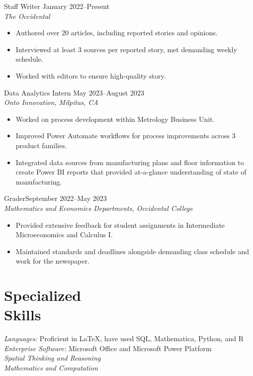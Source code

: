 \documentclass[margin, 12pt]{res} %
\begin{document}
\begin{resume}
Staff Writer \hfill January 2022--Present \\
\textit{The Occidental} 
\begin{itemize} \itemsep -2pt
  \item Authored over 20 articles, including reported stories and opinions.
  \item Interviewed at least 3 sources per reported story, met demanding weekly schedule.
  \item Worked with editors to ensure high-quality story.
\end{itemize} 

{Data Analytics Intern} \hfill May 2023--August 2023 \\
\textit{Onto Innovation, Milpitas, CA}
\begin{itemize} \itemsep -2pt %
  \item Worked on process development within Metrology Business Unit.
  \item Improved Power Automate workflows for process improvements across 3 product families.
  \item Integrated data sources from manufacturing plans and floor information to create Power BI reports that provided at-a-glance understanding of state of manufacturing.
\end{itemize}

Grader\hfill September 2022--May 2023\\
\textit{Mathematics and Economics Departments, Occidental College}
\begin{itemize}\itemsep -2pt
  \item Provided extensive feedback for student assignments in Intermediate Microeconomics and Calculus I.
  \item Maintained standards and deadlines alongside demanding class schedule and work for the newspaper.
\end{itemize}


\section{\sc Specialized \\ Skills} 

{\sl Languages:} Proficient in \LaTeX, have used SQL, Mathematica, Python, and R\\
{\sl Enterprise Software:} Microsoft Office and Microsoft Power Platform\\
{\sl Spatial Thinking and Reasoning}\\
{\sl Mathematics and Computation}

\end{resume}
\end{document}
